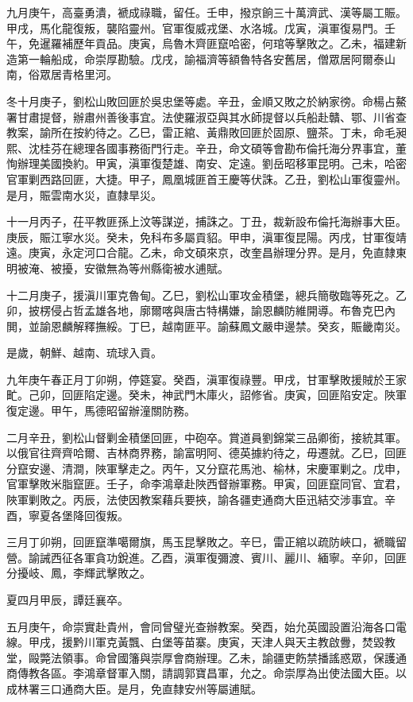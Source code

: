 \begin{pinyinscope}
九月庚午，高臺勇潰，褫成祿職，留任。壬申，撥京餉三十萬濟武、漢等屬工賑。甲戌，馬化龍復叛，襲陷靈州。官軍復威戎堡、水洛城。戊寅，滇軍復易門。壬午，免暹羅補歷年貢品。庚寅，烏魯木齊匪竄哈密，何琯等擊敗之。乙未，福建新造第一輪船成，命崇厚勘驗。戊戌，諭福濟等額魯特各安舊居，僧眾居阿爾泰山南，俗眾居青格里河。

冬十月庚子，劉松山敗回匪於吳忠堡等處。辛丑，金順又敗之於納家徬。命楊占鰲署甘肅提督，辦肅州善後事宜。法使羅淑亞與其水師提督以兵船赴贛、鄂、川省查教案，諭所在按約待之。乙巳，雷正綰、黃鼎敗回匪於固原、鹽茶。丁未，命毛昶熙、沈桂芬在總理各國事務衙門行走。辛丑，命文碩等會勘布倫托海分界事宜，董恂辦理美國換約。甲寅，滇軍復楚雄、南安、定遠。劉岳昭移軍昆明。己未，哈密官軍剿西路回匪，大捷。甲子，鳳凰城匪首王慶等伏誅。乙丑，劉松山軍復靈州。是月，賑雲南水災，直隸旱災。

十一月丙子，茌平教匪孫上汶等謀逆，捕誅之。丁丑，裁新設布倫托海辦事大臣。庚辰，賑江寧水災。癸未，免科布多屬貢貂。甲申，滇軍復昆陽。丙戌，甘軍復靖遠。庚寅，永定河口合龍。乙未，命文碩來京，改奎昌辦理分界。是月，免直隸東明被淹、被擾，安徽無為等州縣衛被水逋賦。

十二月庚子，援滇川軍克魯甸。乙巳，劉松山軍攻金積堡，總兵簡敬臨等死之。乙卯，披楞侵占哲孟雄各地，廓爾喀與唐古特構嫌，諭恩麟防維開導。布魯克巴內閧，並諭恩麟解釋撫綏。丁巳，越南匪平。諭蘇鳳文嚴申邊禁。癸亥，賑畿南災。

是歲，朝鮮、越南、琉球入貢。

九年庚午春正月丁卯朔，停筵宴。癸酉，滇軍復祿豐。甲戌，甘軍擊敗援賊於王家甿。己卯，回匪陷定邊。癸未，神武門木庫火，詔修省。庚寅，回匪陷安定。陜軍復定邊。甲午，馬德昭留辦潼關防務。

二月辛丑，劉松山督剿金積堡回匪，中砲卒。賞道員劉錦棠三品卿銜，接統其軍。以俄官往齊齊哈爾、吉林商界務，諭富明阿、德英據約待之，毋遷就。乙巳，回匪分竄安邊、清澗，陜軍擊走之。丙午，又分竄花馬池、榆林，宋慶軍剿之。戊申，官軍擊敗米脂竄匪。壬子，命李鴻章赴陜西督辦軍務。甲寅，回匪竄同官、宜君，陜軍剿敗之。丙辰，法使因教案藉兵要挾，諭各疆吏通商大臣迅結交涉事宜。辛酉，寧夏各堡降回復叛。

三月丁卯朔，回匪竄準噶爾旗，馬玉昆擊敗之。辛巳，雷正綰以疏防峽口，褫職留營。諭誡西征各軍貪功銳進。乙酉，滇軍復彌渡、賓川、麗川、緬寧。辛卯，回匪分擾岐、鳳，李輝武擊敗之。

夏四月甲辰，譚廷襄卒。

五月庚午，命崇實赴貴州，會同曾璧光查辦教案。癸酉，始允英國設置沿海各口電線。甲戌，援黔川軍克黃飄、白堡等苗寨。庚寅，天津人與天主教啟釁，焚毀教堂，毆斃法領事。命曾國籓與崇厚會商辦理。乙未，諭疆吏飭禁播謠惑眾，保護通商傳教各區。李鴻章督軍入關，請調郭寶昌軍，允之。命崇厚為出使法國大臣。以成林署三口通商大臣。是月，免直隸安州等屬逋賦。


\end{pinyinscope}
